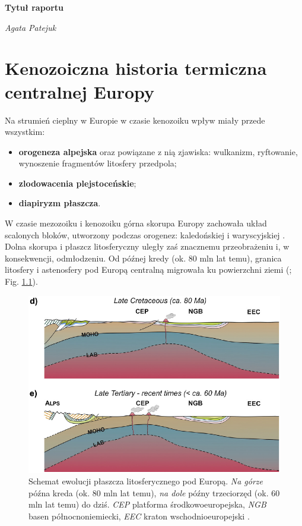 \documentclass[11.5pt,twoside]{report}
\newcommand{\ct}[1]{\ignorespaces} %
\begin{document}
	
\begin{titlepage} %
	\centering
	\vspace*{5cm}
	{\Huge\bfseries Tytuł raportu\par}
	\vspace{1.3cm}
	{\Large\itshape Agata Patejuk}
\end{titlepage}

	
	\tableofcontents
	\thispagestyle{empty} %
	
	\chapter{Kenozoiczna historia termiczna centralnej Europy}
	
Na strumień cieplny w Europie w czasie kenozoiku wpływ miały przede wszystkim:
\begin{itemize}
	\item \textbf{orogeneza alpejska} oraz powiązane z nią zjawiska: wulkanizm, ryftowanie, wynoszenie fragmentów litosfery przedpola;
	\item \textbf{zlodowacenia plejstoceńskie};
	\item \textbf{diapiryzm płaszcza}.
\end{itemize}

W czasie mezozoiku i kenozoiku górna skorupa Europy \ct{(??platformowa)} zachowała układ scalonych bloków, utworzony podczas orogenez: kaledońskiej i waryscyjskiej \ct{zrodlo?}. Dolna skorupa i płaszcz litosferyczny uległy zaś znacznemu przeobrażeniu i, w konsekwencji, odmłodzeniu\ct{zrodlo}. Od pó\'{z}nej kredy (ok. 80 mln lat temu), granica litosfery i astenosfery pod Europą centralną migrowała ku powierzchni ziemi (\cite{Meier.2016}; Fig. \ref{meier}). 

\begin{figure}[h]
	\centering
	\includegraphics[width=0.5\linewidth]{../Termika/Meier2016}
	\caption{Schemat ewolucji płaszcza litosferycznego pod Europą. \textit{Na górze} późna kreda (ok. 80 mln lat temu), \textit{na dole} późny trzeciorzęd (ok. 60 mln lat temu) do dziś. \textit{CEP} platforma środkowoeuropejska, \textit{NGB} basen północnoniemiecki, \textit{EEC} kraton wschodnioeuropejski \parencite{Meier.2016}.}
	\label{meier}
\end{figure}
\end{document}

